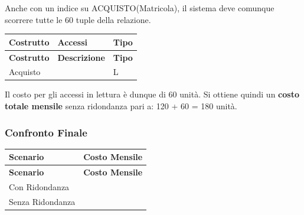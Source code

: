 \begin{itemize}
{       Anche con un indice su ACQUISTO(Matricola), il sistema deve comunque scorrere tutte le 60 tuple della relazione.
       
        \begin{longtable}{|
                >{\centering\arraybackslash}m{2cm}|
                >{\centering\arraybackslash}m{1.5cm}|
                >{\centering\arraybackslash}m{1cm}|
                }
                
                \hline
                \textbf{Costrutto} & \textbf{Accessi} & \textbf{Tipo} \\
                \hline
                \endfirsthead
                
                \hline
                \textbf{Costrutto} & \textbf{Descrizione} & \textbf{Tipo} \\
                \hline
                \endhead
                
                Acquisto & 60 & L \\
                \hline
                
        \end{longtable}

        Il costo per gli accessi in lettura è dunque di 60 unità.
        \newline Si ottiene quindi un \textbf{costo totale mensile} senza ridondanza pari a: 120 + 60 = 180 unità.
    }
\end{itemize}

\vspace{0.5cm}
\subsubsection{Confronto Finale} 
\vspace{0.5cm}
\begin{longtable}{|
                >{\centering\arraybackslash}m{3.5cm}|
                >{\centering\arraybackslash}m{2.5cm}|
                }
                
                \hline
                \textbf{Scenario} & \textbf{Costo Mensile} \\
                \hline
                \endfirsthead
                
                \hline
                \textbf{Scenario} & \textbf{Costo Mensile} \\
                \hline
                \endhead
                
                Con Ridondanza & 250 \\
                \hline

                Senza Ridondanza & 180 \\                
                \hline
                
        \end{longtable}
        
